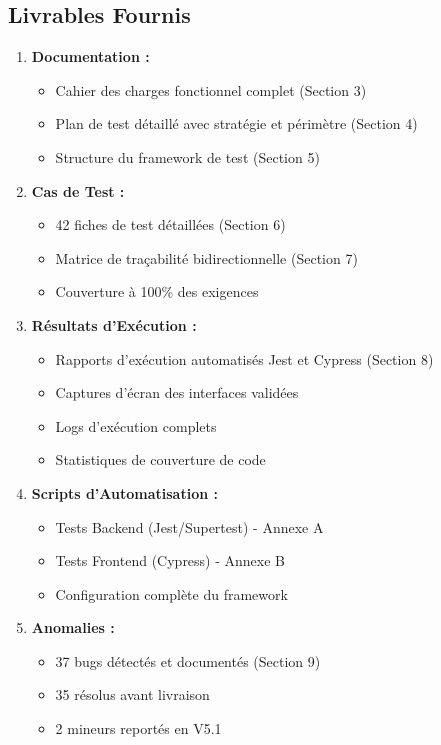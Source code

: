 \documentclass[12pt,a4paper]{article}
\begin{document}
\subsection{Livrables Fournis}
\begin{enumerate}
    \item \textbf{Documentation :}
    \begin{itemize}
        \item Cahier des charges fonctionnel complet (Section 3)
        \item Plan de test détaillé avec stratégie et périmètre (Section 4)
        \item Structure du framework de test (Section 5)
    \end{itemize}
    
    \item \textbf{Cas de Test :}
    \begin{itemize}
        \item 42 fiches de test détaillées (Section 6)
        \item Matrice de traçabilité bidirectionnelle (Section 7)
        \item Couverture à 100\% des exigences
    \end{itemize}
    
    \item \textbf{Résultats d'Exécution :}
    \begin{itemize}
        \item Rapports d'exécution automatisés Jest et Cypress (Section 8)
        \item Captures d'écran des interfaces validées
        \item Logs d'exécution complets
        \item Statistiques de couverture de code
    \end{itemize}
    
    \item \textbf{Scripts d'Automatisation :}
    \begin{itemize}
        \item Tests Backend (Jest/Supertest) - Annexe A
        \item Tests Frontend (Cypress) - Annexe B
        \item Configuration complète du framework
    \end{itemize}
    
    \item \textbf{Anomalies :}
    \begin{itemize}
        \item 37 bugs détectés et documentés (Section 9)
        \item 35 résolus avant livraison
        \item 2 mineurs reportés en V5.1
    \end{itemize}
\end{enumerate}
\end{document}
